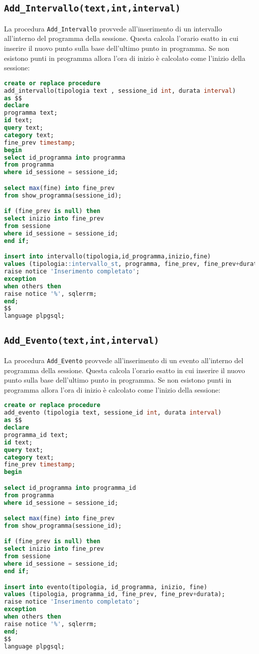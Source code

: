\subsection{\texttt{Add\_Intervallo(text,int,interval)}}
La procedura \texttt{Add\_Intervallo} provvede all'inserimento di un intervallo all'interno del programma della sessione. Questa calcola l'orario esatto in cui inserire il nuovo punto sulla base dell'ultimo punto in programma. Se non esistono punti in programma allora l'ora di inizio è calcolato come l'inizio della sessione:
\begin{lstlisting}[language=SQL,style=mystyle]
create or replace procedure 
add_intervallo(tipologia text , sessione_id int, durata interval)
as $$
declare
programma text;
id text;
query text;
category text;
fine_prev timestamp;
begin
select id_programma into programma
from programma
where id_sessione = sessione_id;

select max(fine) into fine_prev
from show_programma(sessione_id);

if (fine_prev is null) then
select inizio into fine_prev
from sessione
where id_sessione = sessione_id;
end if;

insert into intervallo(tipologia,id_programma,inizio,fine)
values (tipologia::intervallo_st, programma, fine_prev, fine_prev+durata);
raise notice 'Inserimento completato';
exception
when others then
raise notice '%', sqlerrm;
end;
$$ 
language plpgsql;
\end{lstlisting}
\subsection{\texttt{Add\_Evento(text,int,interval)}}
La procedura \texttt{Add\_Evento} provvede all'inserimento di un evento all'interno del programma della sessione. Questa calcola l'orario esatto in cui inserire il nuovo punto sulla base dell'ultimo punto in programma. Se non esistono punti in programma allora l'ora di inizio è calcolato come l'inizio della sessione:
\begin{lstlisting}[language=SQL,style=mystyle]
create or replace procedure 
add_evento (tipologia text, sessione_id int, durata interval)
as $$
declare
programma_id text;
id text;
query text;
category text;
fine_prev timestamp;
begin

select id_programma into programma_id
from programma
where id_sessione = sessione_id;

select max(fine) into fine_prev
from show_programma(sessione_id);

if (fine_prev is null) then
select inizio into fine_prev
from sessione
where id_sessione = sessione_id;
end if;

insert into evento(tipologia, id_programma, inizio, fine)
values (tipologia, programma_id, fine_prev, fine_prev+durata);
raise notice 'Inserimento completato';
exception
when others then
raise notice '%', sqlerrm;
end;
$$
language plpgsql;
\end{lstlisting}
